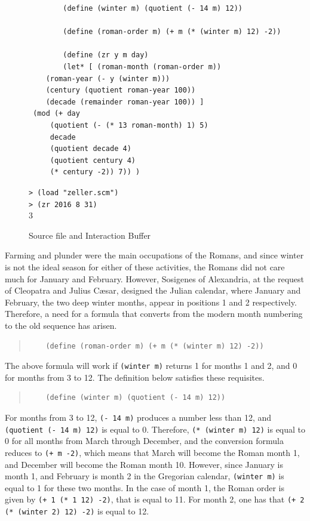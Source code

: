 \documentclass[a4paper,12pt]{book}
\newenvironment{fmpage}[1]
{\begin{lrbox}{\fmbox}\begin{minipage}{#1}}
{\end{minipage}\end{lrbox}\fbox{\usebox{\fmbox}}}
\begin{document}
\begin{figure}[!h]
	\begin{fmpage}{0.9\linewidth}
		\begin{verbatim}
		(define (winter m) (quotient (- 14 m) 12))

		(define (roman-order m) (+ m (* (winter m) 12) -2))

		(define (zr y m day)
		(let* [ (roman-month (roman-order m))
	(roman-year (- y (winter m)))
	(century (quotient roman-year 100))
	(decade (remainder roman-year 100)) ]
 (mod (+ day
	 (quotient (- (* 13 roman-month) 1) 5)
	 decade
	 (quotient decade 4)
	 (quotient century 4)
	 (* century -2)) 7)) )
		\end{verbatim}
	\end{fmpage}

	\begin{fmpage}{0.9\linewidth}
		\verb|> (load "zeller.scm")|\\
		\verb|> (zr 2016 8 31)|\\
		3
	\end{fmpage}
	\caption{Source file and Interaction Buffer}
	\label{fig:date-calculation}
\end{figure}

Farming and plunder were the main
occupations of the Romans, and since winter
is not the ideal season for
either of these activities,
the Romans did not care much for
January and February. However,
Sosigenes of Alexandria,
at the request of Cleopatra and
Julius C\ae sar, designed the
Julian calendar, where January
and February, the two deep winter
months, appear in  positions
1 and 2 respectively.
Therefore, a need for a formula
that converts from the modern
month numbering to the
old sequence has arisen.
\begin{quote}
	\begin{verbatim}
	(define (roman-order m) (+ m (* (winter m) 12) -2))
	\end{verbatim}
\end{quote}
The above formula will work if \verb|(winter m)|
returns 1 for months 1 and 2, and
0 for months from 3 to 12. The definition
below satisfies these requisites.
\begin{quote}
	\begin{verbatim}
	(define (winter m) (quotient (- 14 m) 12))
	\end{verbatim}
\end{quote}
For months from 3 to 12,
\verb|(- 14 m)| produces a number
less than 12, and \verb|(quotient (- 14 m) 12)|
is equal to 0. Therefore,
\verb|(* (winter m) 12)| is equal to
0 for all months from March through December,
and the conversion formula reduces
to \verb|(+ m -2)|, which means that
March will become the Roman month 1, and December
will become the Roman month 10.
However, since January is month 1,
and February is month 2 in the Gregorian
calendar, \verb|(winter m)| is
equal to 1 for these two months.
In the case of month 1,
the Roman order is given by
\verb|(+ 1 (* 1 12) -2)|, that is
equal to 11. For month 2, one has that
\verb|(+ 2 (* (winter 2) 12) -2)|
is equal to 12.
\end{document}
